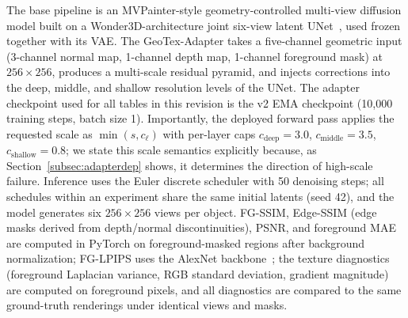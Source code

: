The base pipeline is an MVPainter-style geometry-controlled multi-view diffusion model built on a Wonder3D-architecture joint six-view latent UNet~\cite{shao2025mvpainter,long2023wonder3d}, used frozen together with its VAE. The GeoTex-Adapter takes a five-channel geometric input (3-channel normal map, 1-channel depth map, 1-channel foreground mask) at $256\times256$, produces a multi-scale residual pyramid, and injects corrections into the deep, middle, and shallow resolution levels of the UNet. The adapter checkpoint used for all tables in this revision is the v2 EMA checkpoint (10{,}000 training steps, batch size 1). Importantly, the deployed forward pass applies the requested scale as $\min(s, c_\ell)$ with per-layer caps $c_\mathrm{deep}=3.0$, $c_\mathrm{middle}=3.5$, $c_\mathrm{shallow}=0.8$; we state this scale semantics explicitly because, as Section~\ref{subsec:adapterdep} shows, it determines the direction of high-scale failure. Inference uses the Euler discrete scheduler with 50 denoising steps; all schedules within an experiment share the same initial latents (seed 42), and the model generates six $256\times256$ views per object. FG-SSIM, Edge-SSIM (edge masks derived from depth/normal discontinuities), PSNR, and foreground MAE are computed in PyTorch on foreground-masked regions after background normalization; FG-LPIPS uses the AlexNet backbone~\cite{zhang2018lpips}; the texture diagnostics (foreground Laplacian variance, RGB standard deviation, gradient magnitude) are computed on foreground pixels, and all diagnostics are compared to the same ground-truth renderings under identical views and masks.


